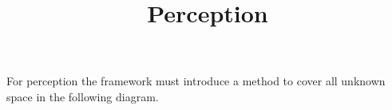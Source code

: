 \documentclass[a4paper]{article}
\title{Perception}
\date{}
\begin{document}
    \maketitle
    
    For perception the framework must introduce a method to cover all unknown space in the following diagram.
    
\end{document}
